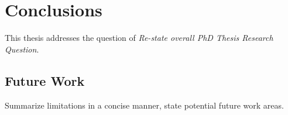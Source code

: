 \chapter{Conclusions}
\label{ch6: conclusions}
\minitoc

This thesis addresses the question of \emph{Re-state overall PhD Thesis Research Question}.


\section{Future Work}
Summarize limitations in a concise manner, state potential future work areas.